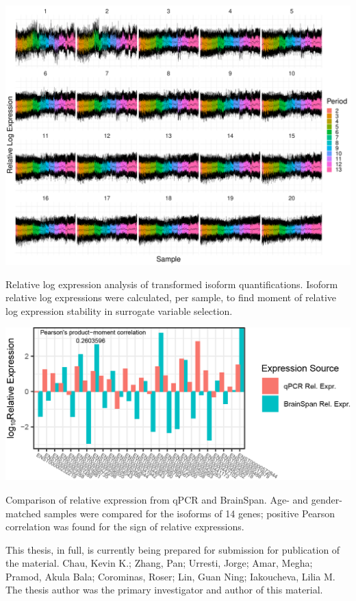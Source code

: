 \documentclass[12pt,chapterheads,final]{ucsd}
\begin{document}
\begin{suppfigure}[h]
  \centering
  \includegraphics[width=1\textwidth]{suppfigure5}
  \caption[Relative log expression analysis of transformed isoform quantifications.]
{Relative log expression analysis of transformed isoform quantifications. Isoform relative log expressions were calculated, per sample, to find moment of relative log expression stability in surrogate variable selection.}
\end{suppfigure}

\begin{suppfigure}[h]
  \centering
  \includegraphics[width=1\textwidth]{suppfigure6}
  \caption[Comparison of relative expression from qPCR and BrainSpan.]
{Comparison of relative expression from qPCR and BrainSpan. Age- and gender-matched samples were compared for the isoforms of 14 genes; positive Pearson correlation was found for the sign of relative expressions.}
\end{suppfigure}
\clearpage
\pagebreak
\newpage
This thesis, in full, is currently being prepared for submission for publication of the material. Chau, Kevin K.; Zhang, Pan; Urresti, Jorge; Amar, Megha; Pramod, Akula Bala; Corominas, Roser; Lin, Guan Ning; Iakoucheva, Lilia M. The thesis author was the primary investigator and author of this material. \par
\end{document}
